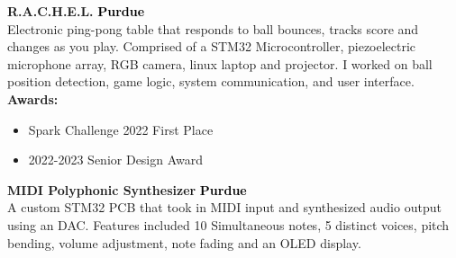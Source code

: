 \documentclass[9pt]{developercv} %
\begin{document}
\vspace{-\headheight}


\begin{minipage}[t]{.50\textwidth}
	\begin{minipage}[t]{1\textwidth} %
		\textbf{R.A.C.H.E.L.}
		\hfill%
		{\footnotesize \textbf{\textcolor{black}{Purdue}}}
		\\
		Electronic ping-pong table that responds to ball bounces, tracks score and changes as you play.
		Comprised of a STM32 Microcontroller, piezoelectric microphone array, RGB camera, linux laptop and projector. I
		worked on ball position detection, game logic, system communication, and user interface.
		\\
		\textbf{Awards:}
		\begin{itemize}[noitemsep,topsep=0pt]
			\setlength\itemsep{0pt}
			\item[$\ast$] Spark Challenge 2022 First Place
			\item[$\ast$] 2022-2023 Senior Design Award
		\end{itemize}
	\end{minipage}
	\begin{minipage}[t]{1\textwidth} %
		\vspace{\baselineskip}
		\textbf{MIDI Polyphonic Synthesizer}
		\hfill%
		{\footnotesize \textbf{\textcolor{black}{Purdue}}}
		\\
		A custom STM32 PCB that took in MIDI input and synthesized audio output using an DAC. Features
		included 10 Simultaneous notes, 5 distinct voices, pitch bending, volume adjustment, note fading and an
		OLED display.
	\end{minipage}
\end{minipage}
\hfill
\end{document}
